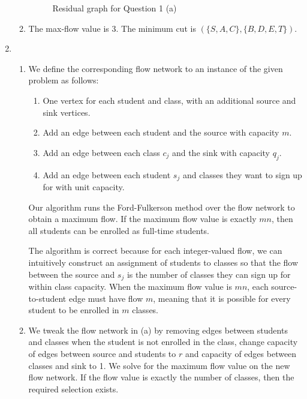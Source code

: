 \documentclass{article}
\begin{document}
\begin{enumerate}
\begin{enumerate}
\begin{figure}[ht]
            \caption{Residual graph for Question 1 (a)}
            \label{fig:1a}
        \end{figure}
        
        \item The max-flow value is 3. The minimum cut is $(\{S, A, C\}, \{B, D, E, T\})$.
    \end{enumerate}

    \item
    \begin{enumerate}
        \item We define the corresponding flow network to an instance of the given problem as follows:
        \begin{enumerate}
            \item One vertex for each student and class, with an additional source and sink vertices.
            \item Add an edge between each student and the source with capacity $m$.
            \item Add an edge between each class $c_j$ and the sink with capacity $q_j$.
            \item Add an edge between each student $s_j$ and classes they want to sign up for with unit capacity.
        \end{enumerate}

        Our algorithm runs the Ford-Fulkerson method over the flow network to obtain a maximum flow. If the maximum flow value is exactly $mn$, then all students can be enrolled as full-time students.

        The algorithm is correct because for each integer-valued flow, we can intuitively construct an assignment of students to classes so that the flow between the source and $s_j$ is the number of classes they can sign up for within class capacity. When the maximum flow value is $mn$, each source-to-student edge must have flow $m$, meaning that it is possible for every student to be enrolled in $m$ classes.
        
        \item We tweak the flow network in (a) by removing edges between students and classes when the student is not enrolled in the class, change capacity of edges between source and students to $r$ and capacity of edges between classes and sink to 1. We solve for the maximum flow value on the new flow network. If the flow value is exactly the number of classes, then the required selection exists.
        

\end{enumerate}
\end{enumerate}
\end{document}
